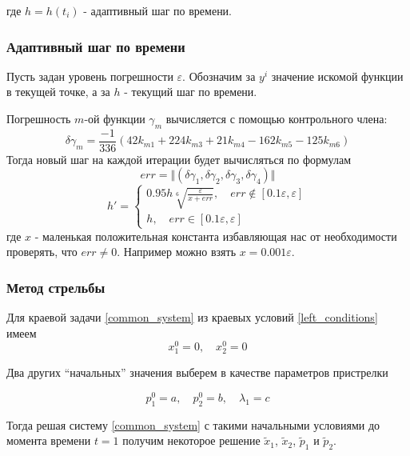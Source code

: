 \documentclass[a4paper,12pt]{article}
\begin{document}
где \(h=h(t_i)\) - адаптивный шаг по времени.

\subsubsection*{Адаптивный шаг по времени}

Пусть задан уровень погрешности \(\varepsilon\). Обозначим за \(y^i\)
значение искомой функции в текущей точке, а за \(h\) - текущий шаг по
времени.

Погрешность \(m\)-ой функции \(\gamma_{m}\) вычисляется с помощью контрольного члена:
\begin{equation*}
  \delta\gamma_{m} = \frac{-1}{336}\left(42 k_{m1}+224k_{m3}+21k_{m4}-162 k_{m5}-125 k_{m6}\right)
\end{equation*}
Тогда новый шаг на каждой итерации будет вычисляться по формулам
\begin{equation*}
  err = \Vert (\delta\gamma_{1}, \delta\gamma_{2}, \delta\gamma_{3}, \delta\gamma_{4})\Vert
\end{equation*}
\begin{equation*}
  h'=\begin{cases}
    0.95 h \sqrt[6]{\frac{\varepsilon}{x+err}}, \quad err \not\in [0.1 \varepsilon, \varepsilon]\\
    h, \quad  err \in [0.1 \varepsilon, \varepsilon]
  \end{cases}
\end{equation*}
где \(x\) - маленькая
положительная константа избавляющая нас от необходимости проверять, что
\(err \neq 0\). Например можно взять \(x=0.001 \varepsilon\).

\subsubsection*{Метод стрельбы}

Для краевой задачи \cref{common_system} из краевых условий \cref{left_conditions} имеем
\begin{equation*}
  x_1^0=0, \quad x_2^0=0
\end{equation*}

Два других ``начальных'' значения выберем в качестве параметров
пристрелки

\begin{equation*}
  p_1^0=a, \quad p_2^0=b, \quad \lambda_1 =c
\end{equation*}

Тогда решая систему \cref{common_system} с такими начальными условиями до момента времени \(t=1\) получим некоторое решение \(\tilde{x}_1\), \(\tilde{x}_2\), \(\tilde{p}_1\) и \(\tilde{p}_2\).
\end{document}

